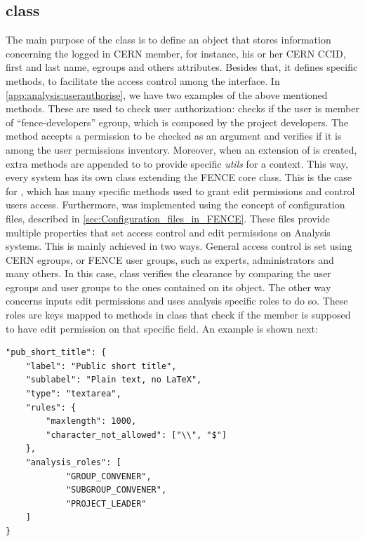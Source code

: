\subsection{ class}%
\label{sec:User_class}

The main purpose of the  class is to define an object that stores information concerning the logged in CERN member, for instance, his or her CERN CCID, first and last name, egroups and others attributes. Besides that, it defines specific methods, to facilitate the access control among the interface.
In \cref{app:analysis:userauthorise}, we have two examples of the above mentioned methods.
These are used to check user authorization:
 checks if the user is member of \enquote{fence-developers} egroup, which is composed by the project developers. %
The method  accepts a permission to be checked as an argument and verifies if it is among the user permissions inventory. %
Moreover, when an extension of  is created, extra methods are appended to  to provide specific \textit{utils} for a context.
This way, every system has its own  class extending the FENCE core  class.
This is the case for , which has many specific methods used to grant edit permissions and control users access.
Furthermore,  was implemented using the concept of configuration files, described in \cref{sec:Configuration_files_in_FENCE}.
These files provide multiple properties that set access control and edit permissions on Analysis systems. This is mainly achieved in two ways. General access control is set using CERN egroups, or FENCE user groups, such as experts, administrators and many others.
In this case,  class verifies the clearance by comparing the user egroups and user groups to the ones contained on its object.
The other way concerns inputs edit permissions and uses analysis specific roles to do so.
These roles are keys mapped to methods in  class that check if the member is supposed to have edit permission on that specific field.
An example is shown next:

\begin{lstlisting}
"pub_short_title": {
    "label": "Public short title",
    "sublabel": "Plain text, no LaTeX",
    "type": "textarea",
    "rules": {
        "maxlength": 1000,
        "character_not_allowed": ["\\", "$"]
    },
    "analysis_roles": [
            "GROUP_CONVENER",
            "SUBGROUP_CONVENER",
            "PROJECT_LEADER"
    ]
}
\end{lstlisting}

